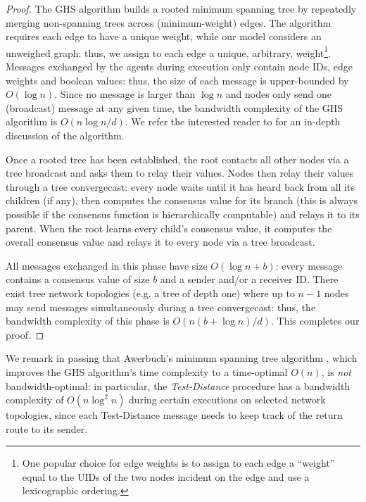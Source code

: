 \documentclass[letterpaper,10pt,conference]{ieeeconf}
\begin{document}
\begin{proof}
The GHS algorithm builds a rooted minimum spanning tree by repeatedly merging non-spanning trees across (minimum-weight) edges. The algorithm requires each edge to have a unique weight, while our model considers an unweighed graph: thus, we assign to each edge a unique, arbitrary, weight\footnote{One popular choice for edge weights is to assign to each edge a ``weight'' equal to the UIDs of the two nodes incident on the edge and use a lexicographic ordering.}. Messages exchanged by the agents during execution only contain node IDs, edge weights and boolean values: thus, the size of each message is upper-bounded by $O(\log n)$. Since no message is larger than $\log n$ and nodes only send one (broadcast) message at any given time, the bandwidth complexity of the GHS algorithm is $O(n\log n /d)$. We refer the interested reader to \cite{RGG-PAH-PMS:83} for an in-depth discussion of the algorithm. 

Once a rooted tree has been established, the root contacts all other nodes via a tree broadcast and asks them to relay their values. Nodes then relay their values through a tree convergecast: every node waits until it has heard back from all its children (if any), then computes the consensus value for its branch (this is always possible if the consensus function is hierarchically computable) and relays it to its parent. When the root learns every child's consensus value, it computes the overall consensus value and relays it to every node via a tree broadcast.

All messages exchanged in this phase have size $O(\log n + b)$: every message contains a consensus value of size $b$ and a sender and/or a receiver ID. There exist tree network topologies (e.g. a tree of depth one) where up to $n-1$ nodes may send messages simultaneously during a tree convergecast: thus, the bandwidth complexity of this phase is $O(n(b+\log n)/d)$. This completes our proof.
\end{proof}

We remark in passing that  Awerbuch's minimum spanning tree algorithm \cite{BAw:87}, which improves the GHS algorithm's time complexity to a time-optimal $O(n)$, is \emph{not} bandwidth-optimal: in particular, the \emph{Test-Distance} procedure has a bandwidth complexity of $O(n\log^2 n)$ during certain executions on selected network topologies, since each Test-Distance message needs to keep track of the return route to its sender.
\end{document}
